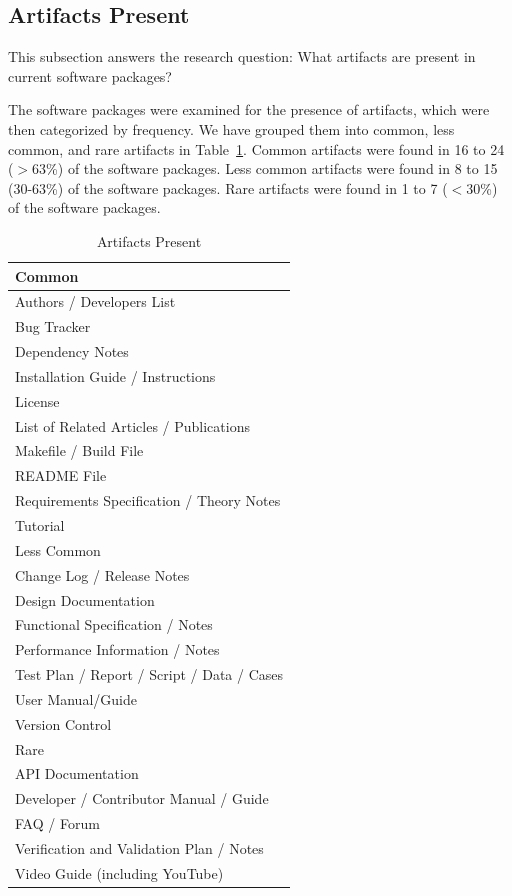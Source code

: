 \documentclass[final, 3p, times, authoryear]{elsarticle}
\begin{document}
\subsection{Artifacts Present} \label{artifacts}

This subsection answers the research question: What artifacts are present in
current software packages?

The software packages were examined for the presence of artifacts, which were
then categorized by frequency. We have grouped them into common, less common,
and rare artifacts in Table~\ref{artifactspresent}. Common artifacts were found
in 16 to 24 ($>$63\%) of the software packages. Less common artifacts were found
in 8 to 15 (30-63\%) of the software packages. Rare artifacts were found in 1 to
7 ($<$30\%) of the software packages. 

\begin{table}
	\begin{center}
		\begin{tabular}{ p{8 cm} }
			\hline
			Common\\
			\hline
			Authors / Developers List\\
			Bug Tracker\\
			Dependency Notes\\
			Installation Guide / Instructions\\
			License\\
			List of Related Articles / Publications\\
			Makefile / Build File\\
			README File\\
			Requirements Specification / Theory Notes\\
			Tutorial\\
			\hline
			Less Common\\
			\hline
			Change Log / Release Notes\\
			Design Documentation\\
			Functional Specification / Notes\\
			Performance Information / Notes\\
			Test Plan / Report / Script / Data / Cases\\
			User Manual/Guide\\
			Version Control\\
			\hline
			Rare\\
			\hline
			API Documentation\\
			Developer / Contributor Manual / Guide\\
			FAQ / Forum\\
			Verification and Validation Plan / Notes\\
			Video Guide (including YouTube)\\
			\hline
		\end{tabular}
		\caption{Artifacts Present} \label{artifactspresent}
	\end{center}
\end{table}
\end{document}
